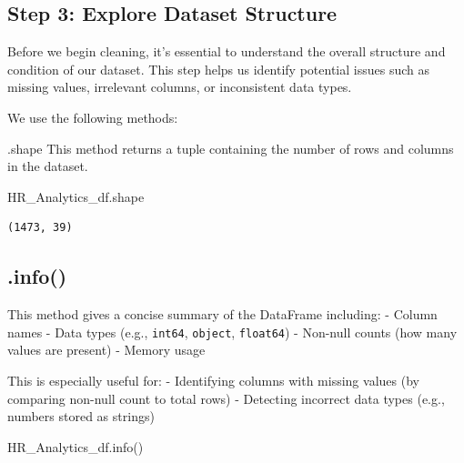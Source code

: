 \documentclass[
  letterpaper,
  DIV=11,
  numbers=noendperiod]{scrartcl}
\newenvironment{Shaded}{\begin{snugshade}}{\end{snugshade}}
\newcommand{\NormalTok}[1]{\textcolor[rgb]{0.00,0.23,0.31}{#1}}
\begin{document}
\subsection{Step 3: Explore Dataset
Structure}\label{step-3-explore-dataset-structure}

Before we begin cleaning, it's essential to understand the overall
structure and condition of our dataset. This step helps us identify
potential issues such as missing values, irrelevant columns, or
inconsistent data types.

We use the following methods:

.shape This method returns a tuple containing the number of rows and
columns in the dataset.

\begin{Shaded}
\begin{Highlighting}[]
\NormalTok{HR\_Analytics\_df.shape}
\end{Highlighting}
\end{Shaded}

\begin{verbatim}
(1473, 39)
\end{verbatim}

\subsection{.info()}\label{info}

This method gives a concise summary of the DataFrame including: - Column
names - Data types (e.g., \texttt{int64}, \texttt{object},
\texttt{float64}) - Non-null counts (how many values are present) -
Memory usage

This is especially useful for: - Identifying columns with missing values
(by comparing non-null count to total rows) - Detecting incorrect data
types (e.g., numbers stored as strings)

\begin{Shaded}
\begin{Highlighting}[]
\NormalTok{HR\_Analytics\_df.info()}
\end{Highlighting}
\end{Shaded}
\end{document}
